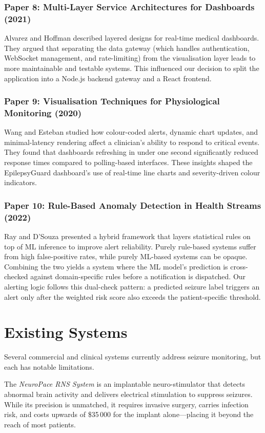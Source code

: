 \documentclass[12pt, a4paper, oneside]{report}
\begin{document}
\subsubsection{Paper 8: Multi-Layer Service Architectures for Dashboards (2021)}
Alvarez and Hoffman \cite{ref8} described layered designs for real-time medical dashboards. They argued that separating the data gateway (which handles authentication, WebSocket management, and rate-limiting) from the visualisation layer leads to more maintainable and testable systems. This influenced our decision to split the application into a Node.js backend gateway and a React frontend.

\subsubsection{Paper 9: Visualisation Techniques for Physiological Monitoring (2020)}
Wang and Esteban \cite{ref9} studied how colour-coded alerts, dynamic chart updates, and minimal-latency rendering affect a clinician's ability to respond to critical events. They found that dashboards refreshing in under one second significantly reduced response times compared to polling-based interfaces. These insights shaped the EpilepsyGuard dashboard's use of real-time line charts and severity-driven colour indicators.

\subsubsection{Paper 10: Rule-Based Anomaly Detection in Health Streams (2022)}
Ray and D'Souza \cite{ref10} presented a hybrid framework that layers statistical rules on top of ML inference to improve alert reliability. Purely rule-based systems suffer from high false-positive rates, while purely ML-based systems can be opaque. Combining the two yields a system where the ML model's prediction is cross-checked against domain-specific rules before a notification is dispatched. Our alerting logic follows this dual-check pattern: a predicted seizure label triggers an alert only after the weighted risk score also exceeds the patient-specific threshold.

\section{Existing Systems}
Several commercial and clinical systems currently address seizure monitoring, but each has notable limitations.

The \textit{NeuroPace RNS System} is an implantable neuro-stimulator that detects abnormal brain activity and delivers electrical stimulation to suppress seizures. While its precision is unmatched, it requires invasive surgery, carries infection risk, and costs upwards of \$35\,000 for the implant alone---placing it beyond the reach of most patients.
\end{document}

